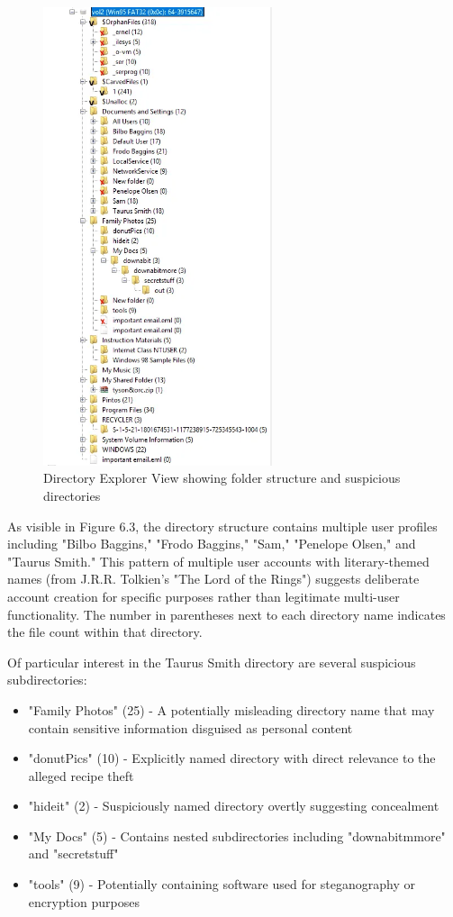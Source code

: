 \begin{figure}[h]
    \centering
    \includegraphics[width=0.6\textwidth]{images/Evidence Examination/Image3.png}
    \caption{Directory Explorer View showing folder structure and suspicious directories}
    \label{fig:directory_explorer}
\end{figure}

As visible in Figure 6.3, the directory structure contains multiple user profiles including "Bilbo Baggins," "Frodo Baggins," "Sam," "Penelope Olsen," and "Taurus Smith." This pattern of multiple user accounts with literary-themed names (from J.R.R. Tolkien's "The Lord of the Rings") suggests deliberate account creation for specific purposes rather than legitimate multi-user functionality. The number in parentheses next to each directory name indicates the file count within that directory.

Of particular interest in the Taurus Smith directory are several suspicious subdirectories:

\begin{itemize}
    \item "Family Photos" (25) - A potentially misleading directory name that may contain sensitive information disguised as personal content
    \item "donutPics" (10) - Explicitly named directory with direct relevance to the alleged recipe theft
    \item "hideit" (2) - Suspiciously named directory overtly suggesting concealment
    \item "My Docs" (5) - Contains nested subdirectories including "downabitmmore" and "secretstuff"
    \item "tools" (9) - Potentially containing software used for steganography or encryption purposes
\end{itemize}

